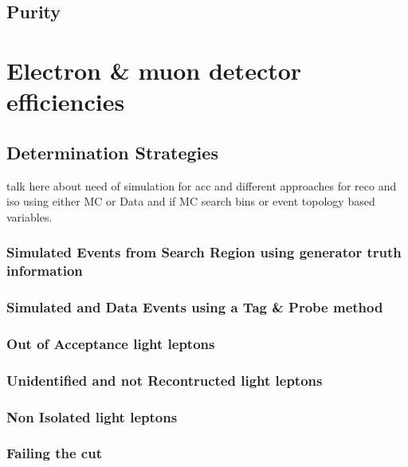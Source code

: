 \subsection{Purity}
\label{sec:Lost_Lepton_CS_Purity}


\section{Electron \& muon detector efficiencies}
\label{sec:Lost_Lepton_Efficiencies_Main}
\subsection{Determination Strategies}
\label{sec:Lost_Lepton_Efficiencies_Strategies}
\todo talk here about need of simulation for acc and different approaches for reco and iso using either MC or Data and if MC search bins or event topology based variables. 
\subsubsection{Simulated Events from Search Region using generator truth information}
\label{sec:Lost_Lepton_Efficiencies_Truth}
\subsubsection{Simulated and Data Events using a Tag \& Probe method}
\label{sec:Lost_Lepton_Tag_Probe}

\subsubsection{Out of Acceptance light leptons}
\label{sec:Lost_Lepton_Tag_Probe}

\subsubsection{Unidentified and not Recontructed light leptons}
\label{sec:Lost_Lepton_Tag_Probe}

\subsubsection{Non Isolated light leptons}
\label{sec:Lost_Lepton_Tag_Probe}

\subsubsection{Failing the \mt cut}
\label{sec:Lost_Lepton_Tag_Probe}

